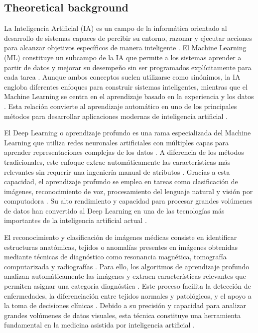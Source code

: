 \subsection{Theoretical background}
\label{sec:theoretical_background}

La Inteligencia Artificial (IA) es un campo de la informática orientado al desarrollo de sistemas capaces de percibir su entorno, razonar y ejecutar acciones para alcanzar objetivos específicos de manera inteligente \cite{ref33}. El Machine Learning (ML) constituye un subcampo de la IA que permite a los sistemas aprender a partir de datos y mejorar su desempeño sin ser programados explícitamente para cada tarea \cite{ref33}. Aunque ambos conceptos suelen utilizarse como sinónimos, la IA engloba diferentes enfoques para construir sistemas inteligentes, mientras que el Machine Learning se centra en el aprendizaje basado en la experiencia y los datos \cite{ref33}. Esta relación convierte al aprendizaje automático en uno de los principales métodos para desarrollar aplicaciones modernas de inteligencia artificial \cite{ref33}.

El Deep Learning o aprendizaje profundo es una rama especializada del Machine Learning que utiliza redes neuronales artificiales con múltiples capas para aprender representaciones complejas de los datos \cite{ref34}. A diferencia de los métodos tradicionales, este enfoque extrae automáticamente las características más relevantes sin requerir una ingeniería manual de atributos \cite{ref34}. Gracias a esta capacidad, el aprendizaje profundo se emplea en tareas como clasificación de imágenes, reconocimiento de voz, procesamiento del lenguaje natural y visión por computadora \cite{ref34}. Su alto rendimiento y capacidad para procesar grandes volúmenes de datos han convertido al Deep Learning en una de las tecnologías más importantes de la inteligencia artificial actual \cite{ref34}.

El reconocimiento y clasificación de imágenes médicas consiste en identificar estructuras anatómicas, tejidos o anomalías presentes en imágenes obtenidas mediante técnicas de diagnóstico como resonancia magnética, tomografía computarizada y radiografías \cite{ref35}. Para ello, los algoritmos de aprendizaje profundo analizan automáticamente las imágenes y extraen características relevantes que permiten asignar una categoría diagnóstica \cite{ref35}. Este proceso facilita la detección de enfermedades, la diferenciación entre tejidos normales y patológicos, y el apoyo a la toma de decisiones clínicas \cite{ref35}. Debido a su precisión y capacidad para analizar grandes volúmenes de datos visuales, esta técnica constituye una herramienta fundamental en la medicina asistida por inteligencia artificial \cite{ref35}.

